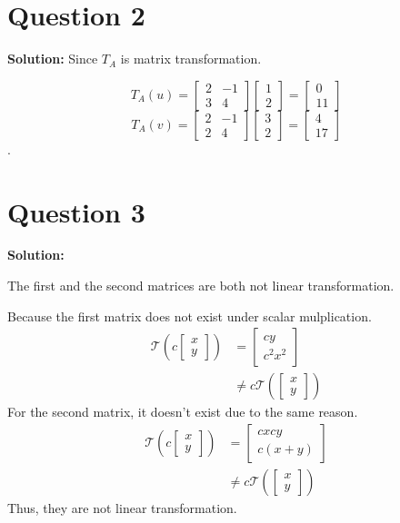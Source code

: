\documentclass[11pt]{article} %
\begin{document}
\section{Question 2}
\textbf{Solution:}
Since $T_A$ is matrix transformation. 

$$T_A(u)= \begin{bmatrix}
	2&-1\\
	3&4
\end{bmatrix}\begin{bmatrix}
1\\2
\end{bmatrix}=\begin{bmatrix}
0\\11
\end{bmatrix}$$
$$T_A(v)=\begin{bmatrix}
	2&-1\\2&4
\end{bmatrix}\begin{bmatrix}
3\\2
\end{bmatrix}=\begin{bmatrix}
4\\17
\end{bmatrix}$$.



\section{Question 3}
\textbf{Solution:}

The first and the second matrices are both not linear transformation. 

Because the first matrix does not exist under scalar mulplication. 
\begin{align*}
	\mathcal{T}(c\begin{bmatrix}
		x\\y
	\end{bmatrix})&=\begin{bmatrix}
	cy\\
	c^2x^2
\end{bmatrix}\\
&\neq c\mathcal{T}(\begin{bmatrix}
	x\\y
\end{bmatrix})
\end{align*}
For the second matrix, it doesn't exist due to the same reason. 
\begin{align*}
	\mathcal{T}(c\begin{bmatrix}
		x\\y
	\end{bmatrix})&=\begin{bmatrix}
	cxcy\\
	c(x+y)
\end{bmatrix}\\
&\neq c\mathcal{T}(\begin{bmatrix}
	x\\
	y
\end{bmatrix})
\end{align*}
Thus, they are not linear transformation. 
\end{document}
